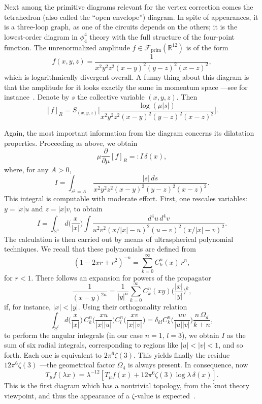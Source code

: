 \documentclass[a4paper,12pt]{article}
\newcommand{\del}{\partial}        %
\newcommand{\dl}{\delta}           %
\newcommand{\F}{\mathcal{F}}       %
\newcommand{\la}{\lambda}          %
\newcommand{\prim}{{\mathrm{prim}}} %
\newcommand{\R}{\mathbb{R}}        %
\newcommand{\Sf}{\mathbb{S}}       %
\newcommand{\7}{\dagger}           %
\theoremstyle{plain}
\theoremstyle{definition}
\begin{document}
Next among the primitive diagrams relevant for the vertex correction
comes the tetrahedron (also called the ``open envelope'') diagram. In
spite of appearances, it is a three-loop graph, as one of the circuits
depends on the others; it is the lowest-order diagram in $\phi^4_4$
theory with the full structure of the four-point function. The
unrenormalized amplitude $f \in \F_\prim(\R^{12})$ is of the form
$$
f(x,y,z) = \frac{1}{x^2 y^2 z^2 (x-y)^2 (y-z)^2 (x-z)^2},
$$
which is logarithmically divergent overall. A funny thing about this
diagram is that the amplitude for it looks exactly the same in
momentum space ---see for instance~\cite{Dirkbook}. Denote by $s$ the
collective variable $(x,y,z)$. Then
$$
[f]_R = S_{(x,y,z)} \biggl[
\frac{\log(\mu|s|)}{x^2 y^2 z^2 (x-y)^2 (y-z)^2 (x-z)^2} \biggr].
$$

Again, the most important information from the diagram concerns its
dilatation properties. Proceeding as above, we obtain
$$
\mu\frac{\del}{\del\mu} [f]_R =: I\,\dl(x),
$$
where, for any $A > 0$,
$$
I = \int_{s^2=A}\, \frac{|s|\,ds}{x^2 y^2 z^2 (x-y)^2 (y-z)^2 (x-z)^2}.
$$
This integral is computable with moderate effort.
First, one rescales variables: $y = |x|u$ and $z = |x|v$, to obtain
$$
I = \int_{\Sf^3} d\biggl( \frac{x}{|x|} \biggr) \int
\frac{d^4u\,d^4v}{u^2v^2(x/|x|-u)^2(u-v)^2(x/|x|-v)^2}.
$$
The calculation is then carried out by means of ultraspherical
polynomial~\cite{AAR, CKTk} techniques. We recall that these
polynomials are defined from
$$
(1 - 2xr + r^2)^{-n} = \sum_{k=0}^\infty C^n_k(x)\,r^n,
$$
for $r < 1$. There follows an expansion for powers of the propagator
$$
\frac{1}{(x-y)^{2n}} = \frac{1}{|y|^n} \sum_{k=0}^\infty C^n_k(xy)
\biggl( \frac{|x|}{|y|} \biggr)^k,
$$
if, for instance, $|x| < |y|$. Using their orthogonality relation
$$
\int_{\Sf^l} d\biggl(\frac{x}{|x|}\biggr)\,
C^n_k\biggl(\frac{xu}{|x||u|}\biggr)
C^n_l\biggl(\frac{xv}{|x||v|}\biggr) =
\dl_{kl} C^n_k\biggl(\frac{uv}{|u||v|}\biggr) \frac{n\,\Omega_d}{k+n},
$$
to perform the angular integrals (in our case $n = 1$, $l = 3$), we
obtain $I$ as the sum of six radial integrals, corresponding to
regions like $|u| < |v| < 1$, and so forth. Each one is equivalent to
$2\pi^6\zeta(3)$. This yields finally the residue $12\pi^6\zeta(3)$
---the geometrical factor $\Omega_4$ is always present. In
consequence, now
$$
T_\mu f(\la x) =
\la^{-12} [T_\mu f(x) + 12\pi^6\zeta(3) \log\la\, \dl(x)].
$$
This is the first diagram which has a nontrivial topology, from the
knot theory viewpoint, and thus the appearance of a $\zeta$-value is
expected~\cite{Dirkbook}.
\end{document}
